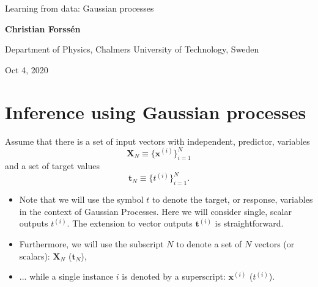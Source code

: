 \documentclass[%
oneside,                 %
final,                   %
10pt]{article}
\begin{document}

\newcommand{\exercisesection}[1]{\subsection*{#1}}







\thispagestyle{empty}

\begin{center}
{\LARGE\bf
\begin{spacing}{1.25}
Learning from data: Gaussian processes
\end{spacing}
}
\end{center}


\begin{center}
{\bf Christian Forssén}
\end{center}

    \begin{center}
\centerline{{\small Department of Physics, Chalmers University of Technology, Sweden}}
\end{center}
    

\begin{center}
Oct 4, 2020
\end{center}

\vspace{1cm}


\section{Inference using Gaussian processes}

Assume that there is a set of input vectors with independent, predictor, variables
\[ \boldsymbol{X}_N \equiv \{ \boldsymbol{x}^{(i)}\}_{i=1}^N \]
and a set of target values
\[ \boldsymbol{t}_N \equiv \{ t^{(i)}\}_{i=1}^N. \]

\begin{itemize}
\item Note that we will use the symbol $t$ to denote the target, or response, variables in the context of Gaussian Processes. Here we will consider single, scalar outputs $t^{(i)}$. The extension to vector outputs $\boldsymbol{t}^{(i)}$ is straightforward.

\item Furthermore, we will use the subscript $N$ to denote a set of $N$ vectors (or scalars): $\boldsymbol{X}_N$ ($\boldsymbol{t}_N$),

\item ... while a single instance $i$ is denoted by a superscript: $\boldsymbol{x}^{(i)}$ ($t^{(i)}$).
\end{itemize}
\end{document}
